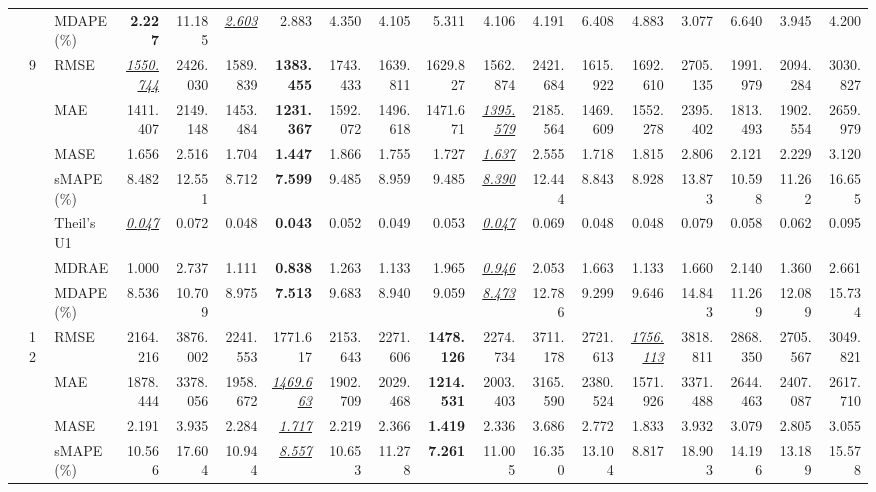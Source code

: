 \begin{table}[!htbp]
{\begin{tabular}{lllrrrrrrrrrrrrrrr}
 &  & MDAPE (\%) & \textbf{2.227} & 11.185 & \underline{\textit{2.603}} & 2.883 & 4.350 & 4.105 & 5.311 & 4.106 & 4.191 & 6.408 & 4.883 & 3.077 & 6.640 & 3.945 & 4.200 \\
\cmidrule(lr){2-18}
 & 9 & RMSE & \underline{\textit{1550.744}} & 2426.030 & 1589.839 & \textbf{1383.455} & 1743.433 & 1639.811 & 1629.827 & 1562.874 & 2421.684 & 1615.922 & 1692.610 & 2705.135 & 1991.979 & 2094.284 & 3030.827 \\
 &  & MAE & 1411.407 & 2149.148 & 1453.484 & \textbf{1231.367} & 1592.072 & 1496.618 & 1471.671 & \underline{\textit{1395.579}} & 2185.564 & 1469.609 & 1552.278 & 2395.402 & 1813.493 & 1902.554 & 2659.979 \\
 &  & MASE & 1.656 & 2.516 & 1.704 & \textbf{1.447} & 1.866 & 1.755 & 1.727 & \underline{\textit{1.637}} & 2.555 & 1.718 & 1.815 & 2.806 & 2.121 & 2.229 & 3.120 \\
 &  & sMAPE (\%) & 8.482 & 12.551 & 8.712 & \textbf{7.599} & 9.485 & 8.959 & 9.485 & \underline{\textit{8.390}} & 12.444 & 8.843 & 8.928 & 13.873 & 10.598 & 11.262 & 16.655 \\
 &  & Theil's U1 & \underline{\textit{0.047}} & 0.072 & 0.048 & \textbf{0.043} & 0.052 & 0.049 & 0.053 & \underline{\textit{0.047}} & 0.069 & 0.048 & 0.048 & 0.079 & 0.058 & 0.062 & 0.095 \\
 &  & MDRAE & 1.000 & 2.737 & 1.111 & \textbf{0.838} & 1.263 & 1.133 & 1.965 & \underline{\textit{0.946}} & 2.053 & 1.663 & 1.133 & 1.660 & 2.140 & 1.360 & 2.661 \\
 &  & MDAPE (\%) & 8.536 & 10.709 & 8.975 & \textbf{7.513} & 9.683 & 8.940 & 9.059 & \underline{\textit{8.473}} & 12.786 & 9.299 & 9.646 & 14.843 & 11.269 & 12.089 & 15.734 \\
\cmidrule(lr){2-18}
 & 12 & RMSE & 2164.216 & 3876.002 & 2241.553 & 1771.617 & 2153.643 & 2271.606 & \textbf{1478.126} & 2274.734 & 3711.178 & 2721.613 & \underline{\textit{1756.113}} & 3818.811 & 2868.350 & 2705.567 & 3049.821 \\
 &  & MAE & 1878.444 & 3378.056 & 1958.672 & \underline{\textit{1469.663}} & 1902.709 & 2029.468 & \textbf{1214.531} & 2003.403 & 3165.590 & 2380.524 & 1571.926 & 3371.488 & 2644.463 & 2407.087 & 2617.710 \\
 &  & MASE & 2.191 & 3.935 & 2.284 & \underline{\textit{1.717}} & 2.219 & 2.366 & \textbf{1.419} & 2.336 & 3.686 & 2.772 & 1.833 & 3.932 & 3.079 & 2.805 & 3.055 \\
 &  & sMAPE (\%) & 10.566 & 17.604 & 10.944 & \underline{\textit{8.557}} & 10.653 & 11.278 & \textbf{7.261} & 11.005 & 16.350 & 13.104 & 8.817 & 18.903 & 14.196 & 13.189 & 15.578 \\

\end{tabular}}
\end{table}
